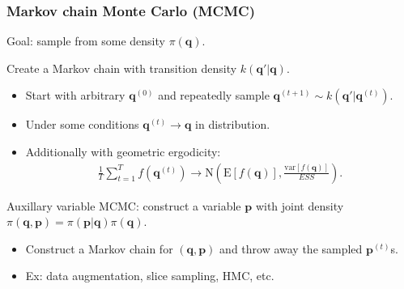 \documentclass[xcolor=dvipsnames]{beamer}
\begin{document}
\begin{frame}
\frametitle{Markov chain Monte Carlo (MCMC)}
Goal: sample from some density $\pi(\bm{q})$.\\

\vspace{0.5cm}

Create a Markov chain with transition density $k(\bm{q}'|\bm{q})$.
\begin{itemize}
\item Start with arbitrary $\bm{q}^{(0)}$ and repeatedly sample $\bm{q}^{(t+1)} \sim k(\bm{q}'|\bm{q}^{(t)})$.\\

\vspace{0.2cm}

\item Under some conditions $\bm{q}^{(t)} \to \bm{q}$ in distribution.

\vspace{0.2cm}

\item Additionally with {\color{red}geometric ergodicity}:
\begin{align*}
  \frac{1}{T}\sum_{t=1}^T f(\bm{q}^{(t)}) \to \mathrm{N}\left(\mathrm{E}[f(\bm{q})], \frac{\mathrm{var}[f(\bm{q})]}{ESS}\right).
\end{align*}
\end{itemize}

\vspace{0.5cm}

Auxillary variable MCMC: construct a variable $\bm{p}$ with joint density $\pi(\bm{q},\bm{p}) = \pi(\bm{p}|\bm{q})\pi(\bm{q})$.
\begin{itemize}
\item Construct a Markov chain for $(\bm{q}, \bm{p})$ and throw away the sampled $\bm{p}^{(t)}$s.
\vspace{0.2cm}
\item Ex: data augmentation, slice sampling, HMC, etc.
\end{itemize}
\end{frame}
\end{document}
